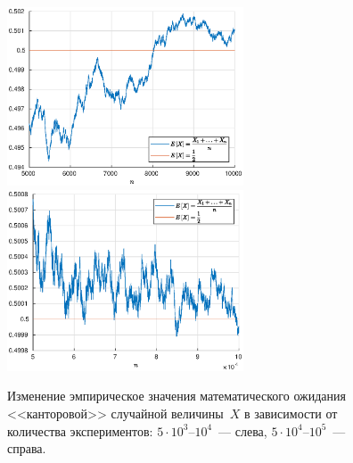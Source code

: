 \begin{figure}[h]
        \hfill
        \includegraphics[width=70mm]{task_02/expectes5t-10t.eps}
        \hfill
        \hfill
        \includegraphics[width=70mm]{task_02/expectes5h-10h.eps}
        \hfill
        \caption{Изменение эмпирическое значения математического ожидания <<канторовой>> случайной величины~$X$ в зависимости от количества экспериментов: $5\cdot10^3$--$10^4$~--- слева, $5\cdot10^4$--$10^5$~--- справа.}
\end{figure}